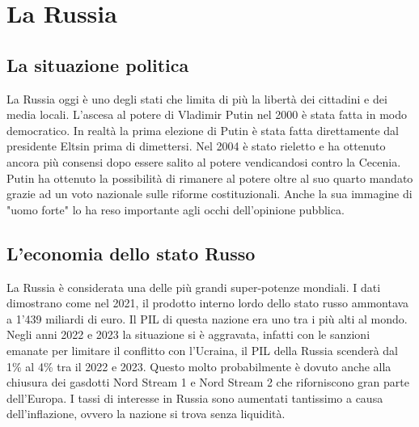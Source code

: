 \documentclass[a4paper, 12pt]{article}
\begin{document}
\pagebreak

\section{La Russia}

\subsection{La situazione politica}

La Russia oggi è uno degli stati che limita di più la libertà dei cittadini e dei media locali. L'ascesa al potere di Vladimir Putin nel 2000 è stata fatta in modo democratico. In realtà la prima elezione di Putin è stata fatta direttamente dal presidente Eltsin prima di dimettersi. Nel 2004 è stato rieletto e ha ottenuto ancora più consensi dopo essere salito al potere vendicandosi contro la Cecenia. Putin ha ottenuto la possibilità di rimanere al potere oltre al suo quarto mandato grazie ad un voto nazionale sulle riforme costituzionali. Anche la sua immagine di "uomo forte" lo ha reso importante agli occhi dell'opinione pubblica.



\subsection{L'economia dello stato Russo}

La Russia è considerata una delle più grandi super-potenze mondiali. I dati dimostrano come nel 2021, il prodotto interno lordo dello stato russo ammontava a 1'439 miliardi di euro. Il PIL di questa nazione era uno tra i più alti al mondo. Negli anni 2022 e 2023 la situazione si è aggravata, infatti con le sanzioni emanate per limitare il conflitto con l'Ucraina, il PIL della Russia scenderà dal 1\% al 4\% tra il 2022 e 2023. Questo molto probabilmente è dovuto anche alla chiusura dei gasdotti Nord Stream 1 e Nord Stream 2 che riforniscono gran parte dell'Europa. I tassi di interesse in Russia sono aumentati tantissimo a causa dell'inflazione, ovvero la nazione si trova senza liquidità. 
\end{document}
